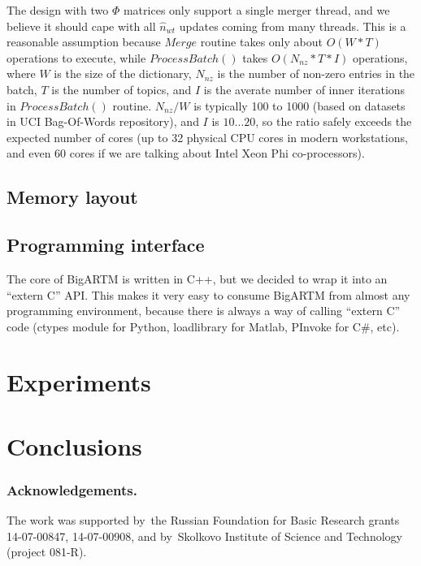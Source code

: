\documentclass{llncs}
\begin{document}
The design with two $\Phi$ matrices only support a single merger thread,
and we believe it should cape with all $\hat n_{wt}$ updates coming from many threads.
This is a reasonable assumption because
$Merge$ routine takes only about $O(W * T)$ operations to execute, while
$ProcessBatch()$ takes $O(N_{nz} * T * I)$ operations,
where
$W$ is the size of the dictionary,
$N_{nz}$ is the number of non-zero entries in the batch,
$T$ is the number of topics,
and $I$ is the averate number of inner iterations in $ProcessBatch()$ routine.
$N_{nz} / W$ is typically 100 to 1000 (based on datasets in UCI Bag-Of-Words repository),
and $I$ is $10 \dots 20$, so the ratio safely exceeds the expected number of cores
(up to 32 physical CPU cores in modern workstations, and even 60 cores if we are talking about Intel Xeon Phi co-processors).

\subsection{Memory layout}

\subsection{Programming interface}

The core of BigARTM is written in C++, but we decided to wrap it into an ``extern C'' API.
This makes it very easy to consume BigARTM from almost any programming environment,
because there is always a way of calling ``extern C'' code
(ctypes module for Python, loadlibrary for Matlab, PInvoke for C\#, etc).








\section{Experiments}
\label{sec:Experiments}

\section{Conclusions}
\label{sec:Conclusions}

\bigskip
\subsubsection*{Acknowledgements.}
    The work was supported by~the Russian Foundation for Basic Research grants 14-07-00847, 14-07-00908,
    and by~Skolkovo Institute of Science and Technology (project 081-R).

%


\end{document}
